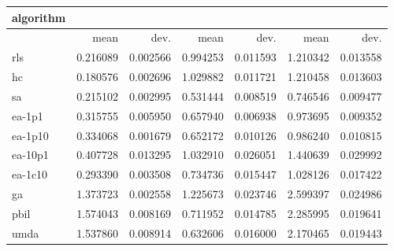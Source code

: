 \begin{tabular}{@{}l*{6}{>{{}}N{1}{2}}@{}}
\toprule
{algorithm} &  &  &  \\
\midrule
& {mean} & {dev.} & {mean} & {dev.} & {mean} & {dev.} \\
\midrule
rls & 0.216089 & 0.002566 & 0.994253 & 0.011593 & 1.210342 & 0.013558 \\
 hc & 0.180576 & 0.002696 & 1.029882 & 0.011721 & 1.210458 & 0.013603 \\
 sa & 0.215102 & 0.002995 & 0.531444 & 0.008519 & 0.746546 & 0.009477 \\
 ea-1p1 & 0.315755 & 0.005950 & 0.657940 & 0.006938 & 0.973695 & 0.009352 \\
 ea-1p10 & 0.334068 & 0.001679 & 0.652172 & 0.010126 & 0.986240 & 0.010815 \\
 ea-10p1 & 0.407728 & 0.013295 & 1.032910 & 0.026051 & 1.440639 & 0.029992 \\
 ea-1c10 & 0.293390 & 0.003508 & 0.734736 & 0.015447 & 1.028126 & 0.017422 \\
 ga & 1.373723 & 0.002558 & 1.225673 & 0.023746 & 2.599397 & 0.024986 \\
 pbil & 1.574043 & 0.008169 & 0.711952 & 0.014785 & 2.285995 & 0.019641 \\
 umda & 1.537860 & 0.008914 & 0.632606 & 0.016000 & 2.170465 & 0.019443 \\
 \bottomrule
\end{tabular}
